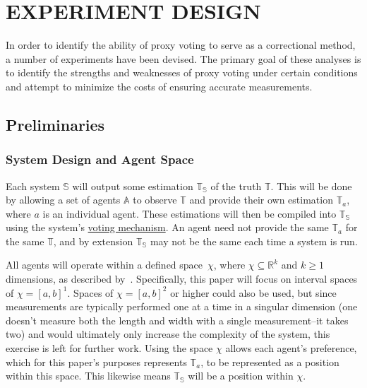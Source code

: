 %
%

\chapter{EXPERIMENT DESIGN}\label{ch:experiment-design}
In order to identify the ability of proxy voting to serve as a correctional
method, a number of experiments have been devised.
The primary goal of these analyses is to identify the strengths and
weaknesses of proxy voting under certain conditions and attempt to minimize
the costs of ensuring accurate measurements.


\section{Preliminaries}\label{sec:preliminaries}

\subsection{System Design and Agent Space}\label{subsec:system-design-and
-agent-space}
Each system $\mathbb{S}$ will output some estimation $\mathbb{T}_\mathbb{S}$
of the truth $\mathbb{T}$.
This will be done by allowing a set of agents $\mathbb{A}$ to observe
$\mathbb{T}$ and provide their own estimation $\mathbb{T}_a$, where $a$ is an
individual agent.
These estimations will then be compiled into $\mathbb{T}_\mathbb{S}$ using
the system's \hyperref[subsec:voting-mechanisms]{voting mechanism}.
An agent need not provide the same $\mathbb{T}_a$ for the same $\mathbb{T}$,
and by extension $\mathbb{T}_\mathbb{S}$ may not be the same each time a
system is run.

All agents will operate within a defined space~$\chi$, where $\chi \subseteq
\mathbb{R}^k$ and $k \geq 1$ dimensions, as described
by~\cite[para.~2.1]{Cohensius2017}.
Specifically, this paper will focus on interval spaces of $\chi = [a, b]^1$.
Spaces of $\chi = [a, b]^2$ or higher could also be used, but since
measurements are typically performed one at a time in a singular dimension (one
doesn't measure both the length and width with a single measurement--it takes
two) and would ultimately only increase the complexity of the system, this
exercise is left for further work.
Using the space $\chi$ allows each agent's preference, which for this paper's
purposes represents $\mathbb{T}_a$, to be represented as a position within
this space.
This likewise means $\mathbb{T}_\mathbb{S}$ will be a position within $\chi$.

